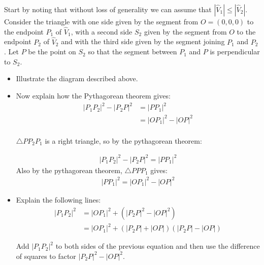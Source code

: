 \documentclass{ximera}
\begin{document}
\begin{problem}
Start by noting that without loss of generality we can assume that
$\left\vert \hat{V} _{1}\right\vert \le\left\vert
\hat{V}_{2}\right\vert$. Consider the triangle with one side given by
the segment from $O=\left( 0,0,0\right) $ to the endpoint $P_{1}$ of
$\hat{V}_{1}$, with a second side $S_{2}$ given by the segment from
$O$ to the endpoint $P_{2}$ of $\hat{V}_{2}$ and with the third side
given by the segment joining $P_{1}$ and $P_{2}$. Let $P$ be the
point on $S_{2}$ so that the segment between $P_{1}$ and $P$ is
perpendicular to $S_{2}$.
\begin{itemize}
\item Illustrate the diagram described above. 


\item Now explain how the Pythagorean theorem gives:
\begin{align*}
|P_{1}P_{2}|^{2} -  |P_{2}P|^{2} &= |PP_{1}|^{2}\\
&= |OP_{1}|^{2} - |OP|^{2}\\
\end{align*}

\begin{freeResponse}
$\triangle PP_{2}P_{1}$ is a right triangle, so by the pythagorean theorem:

\begin{align*}
|P_{1}P_{2}|^{2} - |P_{2}P|^{2} = |PP_{1}|^{2}
\end{align*}
Also by the pythagorean theorem, $ \triangle PPP_{1}$ gives:
\begin{align*}  |PP_{1}|^{2} = |OP_{1}|^{2} - |OP|^{2}
\end{align*}

\end{freeResponse}

\item Explain the following lines:
\begin{align*}
|P_{1}P_{2}|^{2} &= |OP_{1}|^{2}+\left(|P_{2}P|^{2}-|OP|^{2}\right) \\
&=|OP_{1}|^{2}+\left(|P_{2}P|+|OP|\right)\left(|P_{2}P|-|OP| \right)
\end{align*}

\begin{freeResponse}
Add $|P_{1}P_{2}|^2$ to both sides of the previous equation and then use the difference of squares to factor $|P_{2}P|^{2}- |OP|^2$.
\end{freeResponse}


\end{itemize}
\end{problem}
\end{document}
